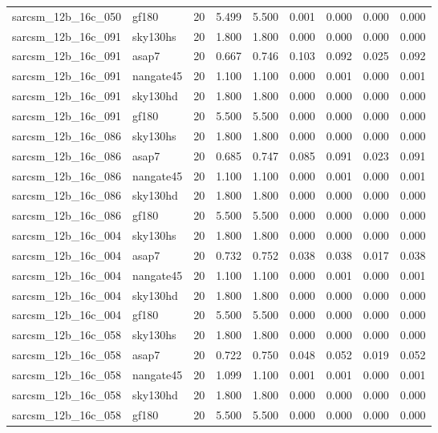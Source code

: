 \begin{tabular}{llrrrrrrr}
sarcsm\_12b\_16c\_050 & gf180 & 20 & 5.499 & 5.500 & 0.001 & 0.000 & 0.000 & 0.000 \\
sarcsm\_12b\_16c\_091 & sky130hs & 20 & 1.800 & 1.800 & 0.000 & 0.000 & 0.000 & 0.000 \\
sarcsm\_12b\_16c\_091 & asap7 & 20 & 0.667 & 0.746 & 0.103 & 0.092 & 0.025 & 0.092 \\
sarcsm\_12b\_16c\_091 & nangate45 & 20 & 1.100 & 1.100 & 0.000 & 0.001 & 0.000 & 0.001 \\
sarcsm\_12b\_16c\_091 & sky130hd & 20 & 1.800 & 1.800 & 0.000 & 0.000 & 0.000 & 0.000 \\
sarcsm\_12b\_16c\_091 & gf180 & 20 & 5.500 & 5.500 & 0.000 & 0.000 & 0.000 & 0.000 \\
sarcsm\_12b\_16c\_086 & sky130hs & 20 & 1.800 & 1.800 & 0.000 & 0.000 & 0.000 & 0.000 \\
sarcsm\_12b\_16c\_086 & asap7 & 20 & 0.685 & 0.747 & 0.085 & 0.091 & 0.023 & 0.091 \\
sarcsm\_12b\_16c\_086 & nangate45 & 20 & 1.100 & 1.100 & 0.000 & 0.001 & 0.000 & 0.001 \\
sarcsm\_12b\_16c\_086 & sky130hd & 20 & 1.800 & 1.800 & 0.000 & 0.000 & 0.000 & 0.000 \\
sarcsm\_12b\_16c\_086 & gf180 & 20 & 5.500 & 5.500 & 0.000 & 0.000 & 0.000 & 0.000 \\
sarcsm\_12b\_16c\_004 & sky130hs & 20 & 1.800 & 1.800 & 0.000 & 0.000 & 0.000 & 0.000 \\
sarcsm\_12b\_16c\_004 & asap7 & 20 & 0.732 & 0.752 & 0.038 & 0.038 & 0.017 & 0.038 \\
sarcsm\_12b\_16c\_004 & nangate45 & 20 & 1.100 & 1.100 & 0.000 & 0.001 & 0.000 & 0.001 \\
sarcsm\_12b\_16c\_004 & sky130hd & 20 & 1.800 & 1.800 & 0.000 & 0.000 & 0.000 & 0.000 \\
sarcsm\_12b\_16c\_004 & gf180 & 20 & 5.500 & 5.500 & 0.000 & 0.000 & 0.000 & 0.000 \\
sarcsm\_12b\_16c\_058 & sky130hs & 20 & 1.800 & 1.800 & 0.000 & 0.000 & 0.000 & 0.000 \\
sarcsm\_12b\_16c\_058 & asap7 & 20 & 0.722 & 0.750 & 0.048 & 0.052 & 0.019 & 0.052 \\
sarcsm\_12b\_16c\_058 & nangate45 & 20 & 1.099 & 1.100 & 0.001 & 0.001 & 0.000 & 0.001 \\
sarcsm\_12b\_16c\_058 & sky130hd & 20 & 1.800 & 1.800 & 0.000 & 0.000 & 0.000 & 0.000 \\
sarcsm\_12b\_16c\_058 & gf180 & 20 & 5.500 & 5.500 & 0.000 & 0.000 & 0.000 & 0.000 \\

\end{tabular}
